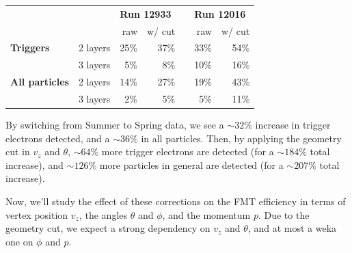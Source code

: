         \begin{center}
            \begin{tabularx}{0.70\textwidth}{Xr|rrcrr}
                & & \multicolumn{2}{l}{\textbf{Run 12933}}        & & \multicolumn{2}{l}{\textbf{Run 12016}} \\
                                       &          & raw  & w/ cut & & raw  & w/ cut \\
                \hline
                \textbf{Triggers}      & 2 layers & 25\% & 37\%   & & 33\% & 54\%   \\
                                       & 3 layers &  5\% &  8\%   & & 10\% & 16\%   \\
                \hline
                \textbf{All particles} & 2 layers & 14\% & 27\%   & & 19\% & 43\%   \\
                                       & 3 layers &  2\% &  5\%   & &  5\% & 11\%
            \end{tabularx}
            \label{tab::fmt_efficiency_study}
        \end{center}

        By switching from Summer to Spring data, we see a $\sim32\%$ increase in trigger electrons detected, and a $\sim36\%$ in all particles.
        Then, by applying the geometry cut in $v_z$ and $\theta$, $\sim64\%$ more trigger electrons are detected (for a $\sim184\%$ total increase), and $\sim126\%$ more particles in general are detected (for a $\sim207\%$ total increase).

        Now, we'll study the effect of these corrections on the FMT efficiency in terms of vertex position $v_z$, the angles $\theta$ and $\phi$, and the momentum $p$.
        Due to the geometry cut, we expect a strong dependency on $v_z$ and $\theta$, and at most a weka one on $\phi$ and $p$.

